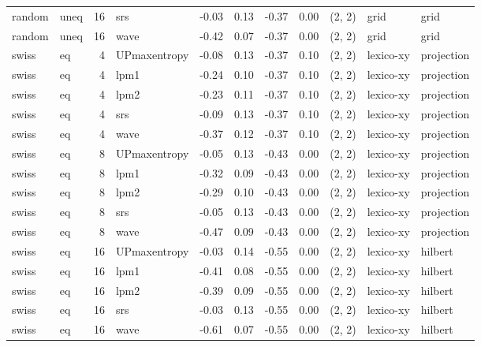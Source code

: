 \begin{tabular}{llrlrrrrlll}
random &  uneq & 16 &          srs & -0.03 &     0.13 &  -0.37 &       0.00 & (2, 2) &        grid &       grid \\
random &  uneq & 16 &         wave & -0.42 &     0.07 &  -0.37 &       0.00 & (2, 2) &        grid &       grid \\
 swiss &    eq &  4 & UPmaxentropy & -0.08 &     0.13 &  -0.37 &       0.10 & (2, 2) &   lexico-xy & projection \\
 swiss &    eq &  4 &         lpm1 & -0.24 &     0.10 &  -0.37 &       0.10 & (2, 2) &   lexico-xy & projection \\
 swiss &    eq &  4 &         lpm2 & -0.23 &     0.11 &  -0.37 &       0.10 & (2, 2) &   lexico-xy & projection \\
 swiss &    eq &  4 &          srs & -0.09 &     0.13 &  -0.37 &       0.10 & (2, 2) &   lexico-xy & projection \\
 swiss &    eq &  4 &         wave & -0.37 &     0.12 &  -0.37 &       0.10 & (2, 2) &   lexico-xy & projection \\
 swiss &    eq &  8 & UPmaxentropy & -0.05 &     0.13 &  -0.43 &       0.00 & (2, 2) &   lexico-xy & projection \\
 swiss &    eq &  8 &         lpm1 & -0.32 &     0.09 &  -0.43 &       0.00 & (2, 2) &   lexico-xy & projection \\
 swiss &    eq &  8 &         lpm2 & -0.29 &     0.10 &  -0.43 &       0.00 & (2, 2) &   lexico-xy & projection \\
 swiss &    eq &  8 &          srs & -0.05 &     0.13 &  -0.43 &       0.00 & (2, 2) &   lexico-xy & projection \\
 swiss &    eq &  8 &         wave & -0.47 &     0.09 &  -0.43 &       0.00 & (2, 2) &   lexico-xy & projection \\
 swiss &    eq & 16 & UPmaxentropy & -0.03 &     0.14 &  -0.55 &       0.00 & (2, 2) &   lexico-xy &    hilbert \\
 swiss &    eq & 16 &         lpm1 & -0.41 &     0.08 &  -0.55 &       0.00 & (2, 2) &   lexico-xy &    hilbert \\
 swiss &    eq & 16 &         lpm2 & -0.39 &     0.09 &  -0.55 &       0.00 & (2, 2) &   lexico-xy &    hilbert \\
 swiss &    eq & 16 &          srs & -0.03 &     0.13 &  -0.55 &       0.00 & (2, 2) &   lexico-xy &    hilbert \\
 swiss &    eq & 16 &         wave & -0.61 &     0.07 &  -0.55 &       0.00 & (2, 2) &   lexico-xy &    hilbert \\

\end{tabular}
